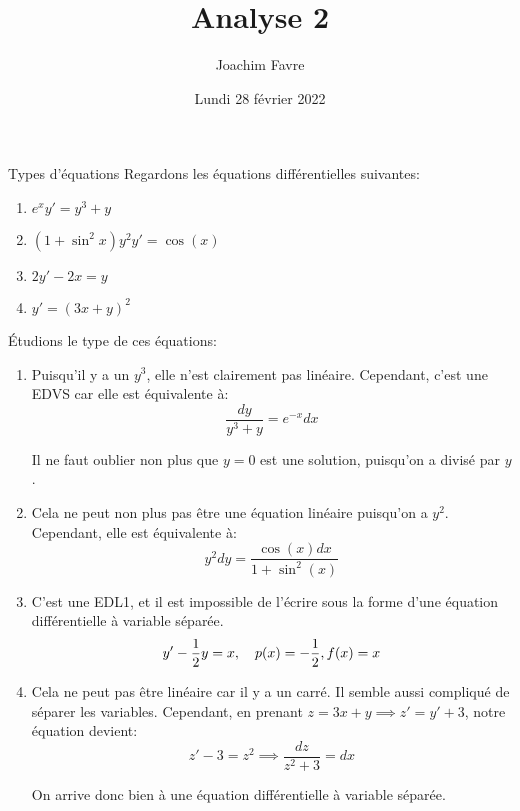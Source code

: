 \documentclass[a4paper]{article}
\title{Analyse 2}
\author{Joachim Favre}
\date{Lundi 28 février 2022}
\begin{document}
\maketitle


\begin{parag}{Types d'équations}
    Regardons les équations différentielles suivantes:
    \begin{enumerate}
        \item $e^x y' = y^3 + y$
        \item $\left(1 + \sin^2 x\right)y^2 y' = \cos\left(x\right)$
        \item $2y' - 2x = y$
        \item $y' = \left(3x + y\right)^2$
    \end{enumerate}

    Étudions le type de ces équations:
    \begin{enumerate}
        \item Puisqu'il y a un $y^3$, elle n'est clairement pas linéaire. Cependant, c'est une EDVS car elle est équivalente à: 
        \[\frac{dy}{y^3 + y} = e^{-x} dx\]

        Il ne faut oublier non plus que $y = 0$ est une solution, puisqu'on a divisé par $y$.        

        \item Cela ne peut non plus pas être une équation linéaire puisqu'on a $y^2$. Cependant, elle est équivalente à: 
            \[y^2 dy = \frac{\cos\left(x\right)dx}{1 + \sin^2\left(x\right)}\]
        
        \item C'est une EDL1, et il est impossible de l'écrire sous la forme d'une équation différentielle à variable séparée.
        \[y' - \frac{1}{2}y = x, \mathspace p\left(x\right) = -\frac{1}{2}, f\left(x\right) = x\]
        
        \item Cela ne peut pas être linéaire car il y a un carré. Il semble aussi compliqué de séparer les variables. Cependant, en prenant $z = 3x + y \implies z' = y' + 3$, notre équation devient: 
        \[z' - 3 = z^2 \implies \frac{dz}{z^2 + 3} = dx\]
        
        On arrive donc bien à une équation différentielle à variable séparée.
    \end{enumerate}
\end{parag}
\end{document}

